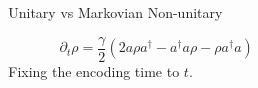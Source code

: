 \documentclass[final]{beamer}
\newlength{\sepwidth}
\newlength{\colwidth}
\newcommand{\separatorcolumn}{\begin{column}{\sepwidth}\end{column}}
\begin{document}
\begin{frame}[t]
\begin{columns}[t]
\begin{column}{\colwidth}
\end{column}
\separatorcolumn

\begin{column}{\colwidth}



\begin{block}{Unitary vs Markovian Non-unitary}
     
     \vspace{-0.05\linewidth}
  {\Large
    \begin{equation*}
      \partial_{t}\rho = \frac{\gamma}{2}(2a\rho a^{\dagger}-a^{\dagger}a\rho - \rho a^{\dagger}a)
    \end{equation*}
}
Fixing the encoding time to $t$.
\end{block}


\end{column}
\end{columns}
\end{frame}
\end{document}

